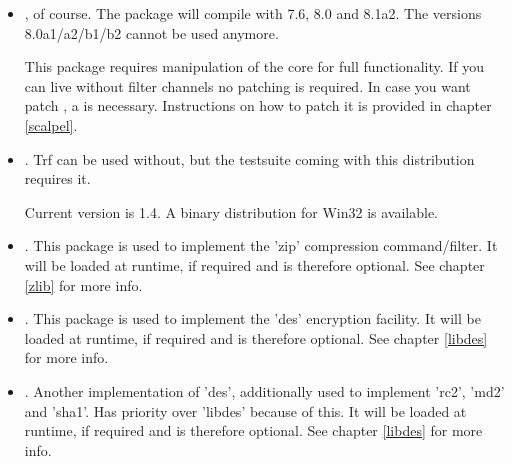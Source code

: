 \documentclass {report}
\begin{document}
\begin{itemize}
\item	\strong {\tcl}, of course. The package will compile with 7.6,
	8.0 and 8.1a2. The versions 8.0a1/a2/b1/b2 cannot be used anymore.

	This package requires manipulation of the core for full
	functionality. If you can live without filter channels no
	patching is required. In case you want patch \tcl, a
	 is necessary. Instructions
	on how to patch it is provided in chapter \ref {scalpel}.

\item	{}. Trf can be used without, but the
	testsuite coming with this distribution requires it.

	Current version is 1.4. A binary distribution for Win32 is
	available.


	
\item	\strong {\zlib}. This package is used to implement the 'zip'
	compression command/filter. It will be loaded at runtime, if
	required and is therefore optional. See chapter \ref {zlib} for
	more info.

\item	{}. This package is used to implement the 'des'
	encryption facility. It will be loaded at runtime, if
	required and is therefore optional. See chapter \ref {libdes}
	for more info.

\item	\strong {\SSLeay}. Another implementation of 'des',
	additionally used to implement 'rc2', 'md2' and 'sha1'. Has
	priority over 'libdes' because of this. It will be loaded at
	runtime, if required and is therefore optional. See chapter
	\ref {libdes} for more info.
\end{itemize}
\end{document}
